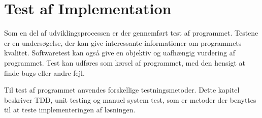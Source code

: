 \chapter{Test af Implementation}

Som en del af udviklingsprocessen er der gennemført test af programmet. Testene er en undersøgelse, der kan give interessante informationer om programmets kvalitet. Softwaretest kan også give en objektiv og uafhængig vurdering af programmet. Test kan udføres som kørsel af programmet, med den hensigt at finde bugs eller andre fejl.

Til test af programmet anvendes forskellige testningsmetoder. Dette kapitel beskriver TDD, unit testing og manuel system test, som er metoder der benyttes til at teste implementeringen af løsningen.



